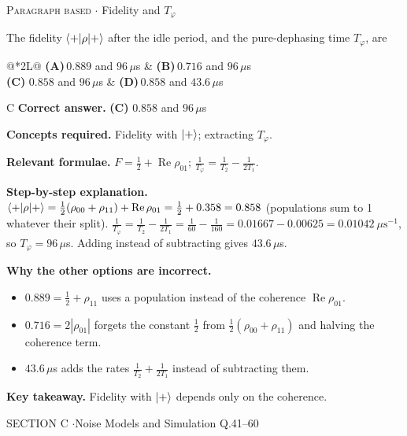 \documentclass[11pt,a4paper]{article}
\newcommand{\optlabel}[1]{\textbf{(#1)}}
\newcommand{\correctlabel}[1]{\textcolor{okgreen}{\textbf{(#1)}\,\ding{51}}}
\newenvironment{qitem}[1]{\begin{list}{}{\setlength{\leftmargin}{3.3em}\setlength{\labelwidth}{3.1em}%
  \setlength{\labelsep}{0.2em}\setlength{\topsep}{3pt}\setlength{\parsep}{3pt}}\item[\textbf{Q.#1}\hfill]}{\end{list}}
\newcommand{\qsep}{\par\vspace{2pt}{\color{black!15}\hrule}\vspace{4pt}}
\newcommand{\qmeta}[2]{{\footnotesize\color{black!60}\textsc{#1} \;$\cdot$\; #2}\par}
\begin{document}
\begin{qitem}{40}
\qmeta{Paragraph based}{Fidelity and $T_\varphi$}
The fidelity $\braket{+|\rho|+}$ after the idle period, and the pure-dephasing time $T_\varphi$, are
\par\smallskip\noindent\begin{tabularx}{\linewidth}{@{}*{2}{L}@{}}
\optlabel{A}\,$0.889$ and $96\,\mu$s & \optlabel{B}\,$0.716$ and $96\,\mu$s \\[3pt]
\correctlabel{C}\,$0.858$ and $96\,\mu$s & \optlabel{D}\,$0.858$ and $43.6\,\mu$s
\end{tabularx}
\end{qitem}
\begin{solbox}{C}
\textbf{\color{brand}Correct answer.} \textcolor{okgreen}{\textbf{(C)}} $0.858$ and $96\,\mu$s

\textbf{\color{brand}Concepts required.} Fidelity with $\ket+$; extracting $T_\varphi$.

\textbf{\color{brand}Relevant formulae.} $F = \frac12 + \operatorname{Re}\rho_{01}$; $\frac1{T_\varphi} = \frac1{T_2} - \frac1{2T_1}$.

\textbf{\color{brand}Step-by-step explanation.} $\braket{+|\rho|+} = \frac12(\rho_{00} + \rho_{11}) + \operatorname{Re}\rho_{01} = \frac12 + 0.358 = 0.858$ (populations sum to 1 whatever their split).
$\frac{1}{T_\varphi} = \frac{1}{T_2} - \frac{1}{2T_1} = \frac{1}{60} - \frac{1}{160} = 0.01667 - 0.00625 = 0.01042\ \mu\text{s}^{-1}$, so $T_\varphi = 96\,\mu$s.
Adding instead of subtracting gives $43.6\,\mu$s.

\textbf{\color{brand}Why the other options are incorrect.}
\begin{itemize}[leftmargin=2.4em, itemsep=1pt, topsep=2pt]
\item[\textbf{(A)}] $0.889 = \frac12 + \rho_{11}$ uses a population instead of the coherence $\operatorname{Re}\rho_{01}$.
\item[\textbf{(B)}] $0.716 = 2|\rho_{01}|$ forgets the constant $\frac12$ from $\frac12(\rho_{00} + \rho_{11})$ and halving the coherence term.
\item[\textbf{(D)}] $43.6\,\mu$s adds the rates $\frac1{T_2} + \frac{1}{2T_1}$ instead of subtracting them.
\end{itemize}
\textbf{\color{brand}Key takeaway.} Fidelity with $\ket+$ depends only on the coherence.
\end{solbox}
\qsep

\newpage

\begin{sectionbanner}SECTION C \enspace$\cdot$\enspace Noise Models and Simulation \hfill Q.41--60\end{sectionbanner}
\end{document}
